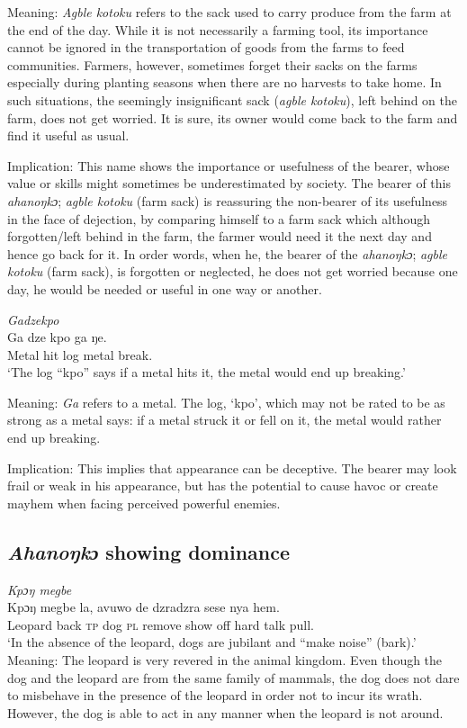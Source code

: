 \documentclass[output=paper]{langscibook}
\begin{document}
\noindent Meaning: {\textit{Agble kotoku}} refers to the sack used to carry produce from the farm at the end of the day. While it is not necessarily a farming tool, its importance cannot be ignored in the transportation of goods from the farms to feed communities. Farmers, however, sometimes forget their sacks on the farms especially during planting seasons when there are no harvests to take home. In such situations, the seemingly insignificant sack ({\textit{agble kotoku}}), left behind on the farm, does not get worried. It is sure, its owner would come back to the farm and find it useful as usual.\largerpage

\begin{sloppypar}
Implication: This name shows the importance or usefulness of the bearer, whose value or skills might sometimes be underestimated by society. The bearer of this {\textit{ahanoŋkɔ}}; {\textit{agble kotoku}} (farm sack) is reassuring the non-bearer of its usefulness in the face of dejection, by comparing himself to a farm sack which although forgotten/left behind in the farm, the farmer would need it the next day and hence go back for it. In order words, when he, the bearer of the {\textit{ahanoŋkɔ}}; {\textit{agble kotoku}} (farm sack), is forgotten or neglected, he does not get worried because one day, he would be needed or useful in one way or another.
\end{sloppypar}


\ea \emph{Gadzekpo}\\
\gll Ga dze kpo ga ŋe.\\
Metal hit log metal break.\\
\glt  ‘The log “kpo” says if a metal hits it, the metal would end up breaking.’
\z

\noindent Meaning: \textit{Ga} refers to a metal. The log, `kpo', which may not be rated to be as strong as a metal says: if a metal struck it or fell on it, the metal would rather end up breaking.

Implication: This implies that appearance can be deceptive. The bearer may look frail or weak in his appearance, but has the potential to cause havoc or create mayhem when facing perceived powerful enemies.

\subsection{{\textit{Ahanoŋkɔ}} showing dominance}\largerpage
\ea \emph{Kpɔŋ megbe}\\
\gll Kpɔŋ megbe la, avuwo de dzradzra sese nya hem.\\
Leopard back \textsc{tp} {dog \textsc{pl}} remove {show off} hard talk pull.\\
\glt  ‘In the absence of the leopard, dogs are jubilant and ``make noise'' (bark).’
\z
\noindent Meaning: The leopard is very revered in the animal kingdom. Even though the dog and the leopard are from the same family of mammals, the dog does not dare to misbehave in the presence of the leopard in order not to incur its wrath. However, the dog is able to act in any manner when the leopard is not around.
\end{document}
